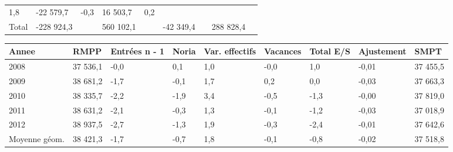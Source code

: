 \begin{longtable}[]{@{}lllllllll@{}}
\begin{minipage}[t]{0.06\columnwidth}
1,8\strut
\end{minipage} & \begin{minipage}[t]{0.12\columnwidth}\raggedright
-22 579,7\strut
\end{minipage} & \begin{minipage}[t]{0.06\columnwidth}\raggedright
-0,3\strut
\end{minipage} & \begin{minipage}[t]{0.08\columnwidth}\raggedright
16 503,7\strut
\end{minipage} & \begin{minipage}[t]{0.06\columnwidth}\raggedright
0,2\strut
\end{minipage}\tabularnewline
\begin{minipage}[t]{0.05\columnwidth}\raggedright
Total\strut
\end{minipage} & \begin{minipage}[t]{0.10\columnwidth}\raggedright
-228 924,3\strut
\end{minipage} & \begin{minipage}[t]{0.06\columnwidth}\raggedright
\strut
\end{minipage} & \begin{minipage}[t]{0.17\columnwidth}\raggedright
560 102,1\strut
\end{minipage} & \begin{minipage}[t]{0.06\columnwidth}\raggedright
\strut
\end{minipage} & \begin{minipage}[t]{0.12\columnwidth}\raggedright
-42 349,4\strut
\end{minipage} & \begin{minipage}[t]{0.06\columnwidth}\raggedright
\strut
\end{minipage} & \begin{minipage}[t]{0.08\columnwidth}\raggedright
288 828,4\strut
\end{minipage} & \begin{minipage}[t]{0.06\columnwidth}\raggedright
\strut
\end{minipage}\tabularnewline
\bottomrule
\end{longtable}

\begin{longtable}[]{@{}lllllllll@{}}
\toprule
Annee & RMPP & Entrées n - 1 & Noria & Var. effectifs & Vacances & Total
E/S & Ajustement & SMPT\tabularnewline
\midrule
\endhead
2008 & 37 536,1 & -0,0 & 0,1 & 1,0 & -0,0 & 1,0 & -0,01 & 37
455,5\tabularnewline
2009 & 38 681,2 & -1,7 & -0,1 & 1,7 & 0,2 & 0,0 & -0,03 & 37
663,3\tabularnewline
2010 & 38 335,7 & -2,2 & -1,9 & 3,4 & -0,5 & -1,3 & -0,00 & 37
819,0\tabularnewline
2011 & 38 631,2 & -2,1 & -0,3 & 1,3 & -0,1 & -1,2 & -0,03 & 37
018,9\tabularnewline
2012 & 38 937,5 & -2,7 & -1,3 & 1,9 & -0,3 & -2,4 & -0,01 & 37
642,6\tabularnewline
Moyenne géom. & 38 421,3 & -1,7 & -0,7 & 1,8 & -0,1 & -0,8 & -0,02 & 37
518,8\tabularnewline
\bottomrule
\end{longtable}

